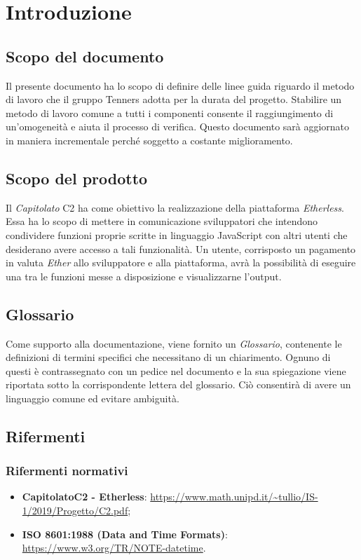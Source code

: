 \section{Introduzione}

\subsection{Scopo del documento}
Il presente documento ha lo scopo di definire delle linee guida riguardo il metodo di lavoro che il gruppo Tenners adotta per la durata del progetto. Stabilire un metodo di lavoro comune a tutti i componenti consente il raggiungimento di un'omogeneità e aiuta il processo di verifica. Questo documento sar\`a aggiornato in maniera incrementale perché soggetto a costante miglioramento.

\subsection{Scopo del prodotto}
Il \textit{Capitolato\glo} C2 ha come obiettivo la realizzazione della piattaforma \textit{Etherless}. Essa ha lo scopo di mettere in comunicazione sviluppatori che intendono condividere funzioni proprie scritte in linguaggio JavaScript con altri utenti che desiderano avere accesso a tali funzionalità. Un utente, corrisposto un pagamento in valuta \textit{Ether\glo} allo sviluppatore e alla piattaforma, avrà la possibilità di eseguire una tra le funzioni messe a disposizione e visualizzarne l'output.

\subsection{Glossario}
Come supporto alla documentazione, viene fornito un \textit{Glossario}\docs,
contenente le definizioni di termini specifici che necessitano di un chiarimento.
Ognuno di questi è contrassegnato con un pedice \glo nel documento e la sua
spiegazione viene riportata sotto la corrispondente lettera del glossario. Ciò
consentir\`a di avere un linguaggio comune ed evitare ambiguità.

\subsection{Rifermenti}
\subsubsection{Rifermenti normativi}
\begin{itemize}
  \item \textbf{Capitolato\glo C2 - Etherless}: \url{https://www.math.unipd.it/~tullio/IS-1/2019/Progetto/C2.pdf};
  \item \textbf{ISO 8601:1988 (Data and Time Formats)}: \url {https://www.w3.org/TR/NOTE-datetime}.
\end{itemize}

